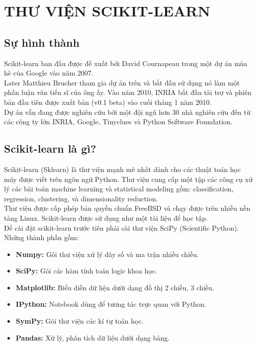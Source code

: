 \chapter{THƯ VIỆN SCIKIT-LEARN}

\section{Sự hình thành}
Scikit-learn ban đầu được đề xuất bởi David Cournapeau trong một dự án mùa hè của Google vào năm 2007.\\

Later Matthieu Brucher tham gia dự án trên và bắt đầu sử dụng nó làm một phần luận văn tiến sĩ của ông ấy. Vào năm 2010, INRIA bắt đầu tài trợ và phiên bản đầu tiên được xuất bản (v0.1 beta) vào cuối tháng 1 năm 2010.\\

Dự án vẫn đang được nghiên cứu bởi một đội ngũ hơn 30 nhà nghiên cứu đến từ các công ty lớn INRIA, Google, Tinyclues và Python Software Foundation.

\section{Scikit-learn là gì?}
Scikit-learn (Sklearn) là thư viện mạnh mẽ nhất dành cho các thuật toán học máy được viết trên ngôn ngữ Python. Thư viện cung cấp một tập các công cụ xử lý các bài toán machine learning và statistical modeling gồm: classification, regression, clustering, và dimensionality reduction.\\

Thư viện được cấp phép bản quyền chuẩn FreeBSD và chạy được trên nhiều nền tảng Linux. Scikit-learn được sử dụng như một tài liệu để học tập.\\

Để cài đặt scikit-learn trước tiên phải cài thư viện SciPy (Scientific Python). Những thành phần gồm:

\begin{itemize}
    \item \textbf{Numpy:} Gói thư viện xử lý dãy số và ma trận nhiều chiều.
    \item \textbf{SciPy:} Gói các hàm tính toán logic khoa học.
    \item \textbf{Matplotlib:} Biểu diễn dữ liệu dưới dạng đồ thị 2 chiều, 3 chiều.
    \item \textbf{IPython:} Notebook dùng để tương tác trực quan với Python.
    \item \textbf{SymPy:} Gói thư viện các kí tự toán học.
    \item \textbf{Pandas:} Xử lý, phân tích dữ liệu dưới dạng bảng.
\end{itemize}

